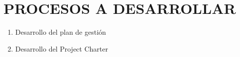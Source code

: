 \chapter{PROCESOS A DESARROLLAR}
%
\begin{enumerate}
	\item{Desarrollo del plan de gesti\'on}
	\item{Desarrollo del Project Charter}
\end{enumerate}
%